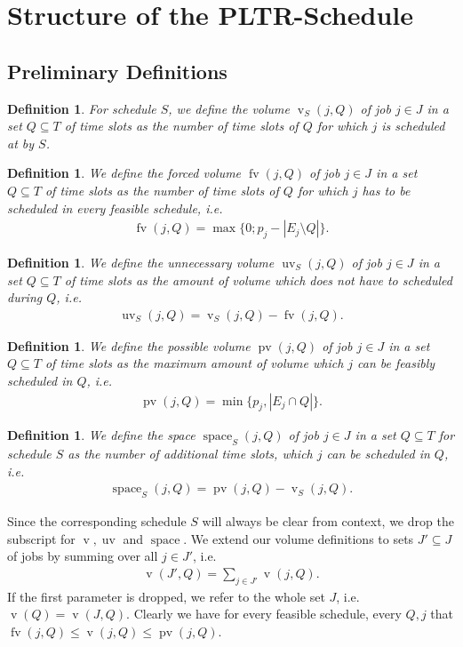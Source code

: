 \documentclass[a4paper]{article}
\DeclareMathOperator{\fv}{fv}
\DeclareMathOperator{\uv}{uv}
\DeclareMathOperator{\pv}{pv}
\DeclareMathOperator{\vol}{v}
\DeclareMathOperator{\spac}{space}
\newtheorem{definition}[theorem]{Definition}
\begin{document}
\section{Structure of the PLTR-Schedule}
\subsection{Preliminary Definitions}
\begin{definition}
  For schedule $S$, we define the \emph{volume} $\vol_S(j, Q)$ of job $j \in J$ in a set $Q \subseteq T$ of time slots as the number of time slots of $Q$ for which $j$ is scheduled at by $S$.
\end{definition}
\begin{definition}
  We define the \emph{forced volume} $\fv(j, Q)$ of job $j \in J$ in a set $Q \subseteq T$ of time slots as the number of time slots of $Q$ for which $j$ has to be scheduled in every feasible schedule, i.e.
  \begin{align}
    \fv(j, Q) = \max\{0; p_j - |E_j \setminus Q|\} \text{.}
  \end{align}
\end{definition}
\begin{definition}
  We define the \emph{unnecessary volume} $\uv_S(j, Q)$ of job $j \in J$ in a set $Q \subseteq T$ of time slots as the amount of volume which does not have to scheduled during $Q$, i.e.
  \begin{align}
    \uv_S(j, Q) = \vol_S(j, Q) - \fv(j,Q)\text{.}
  \end{align}
\end{definition}
\begin{definition}
  We define the \emph{possible volume} $\pv(j, Q)$ of job $j \in J$ in a set $Q \subseteq T$ of time slots as the maximum amount of volume which $j$ can be feasibly scheduled in $Q$, i.e.
  \begin{align}
    \pv(j, Q) = \min\{ p_j, | E_j \cap Q | \} \text{.}
  \end{align}
\end{definition}
\begin{definition}
  We define the \emph{space $\spac_S(j, Q)$ of job $j \in J$ in a set $Q \subseteq T$ for schedule $S$} as the number of additional time slots, which $j$ can be scheduled in $Q$, i.e.\
  \begin{align}
    \spac_S(j, Q) = \pv(j, Q) - \vol_S(j, Q) \text{.}
  \end{align}
\end{definition}
Since the corresponding schedule $S$ will always be clear from context, we drop the subscript for $\vol, \uv$ and $\spac$.
We extend our volume definitions to sets $J' \subseteq J$ of jobs by summing over all $j \in J'$, i.e.
\begin{align}
  \vol(J', Q) = \sum_{j \in J'} \vol(j, Q)\text{.}
\end{align}
If the first parameter is dropped, we refer to the whole set $J$, i.e.\ $\vol(Q) = \vol(J, Q)$.
Clearly we have for every feasible schedule, every $Q, j$ that $\fv(j, Q) \leq \vol(j, Q) \leq \pv(j, Q)$.
\end{document}
